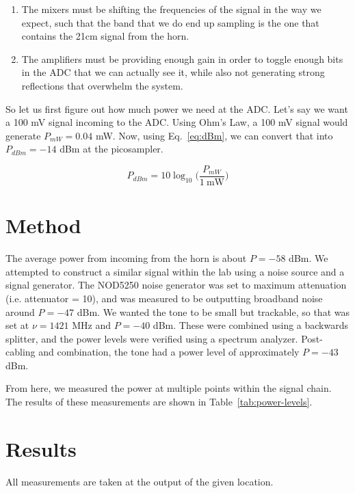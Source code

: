 \documentclass[11pt]{article}
\begin{document}
\begin{enumerate}
 \item The mixers must be shifting the frequencies of the signal in the way we 
  expect, such that the band that we do end up sampling is the one that 
  contains the 21cm signal from the horn.
 \item The amplifiers must be providing enough gain in order to toggle enough 
  bits in the ADC that we can actually see it, while also not generating strong 
  reflections that overwhelm the system.
\end{enumerate}

So let us first figure out how much power we need at the ADC. Let's say we want 
a 100 mV signal incoming to the ADC. Using Ohm's Law, a 100 mV signal would 
generate $P_{mW} = 0.04$ mW. Now, using Eq.~\eqref{eq:dBm}, we can convert that 
into $P_{dBm} = -14$ dBm at the picosampler.

\begin{equation}
    \label{eq:dBm}
    P_{dBm} = 10 \log_{10}\Big(\frac{P_{mW}}{1~\textrm{mW}}\Big)
\end{equation}

\section{Method}

The average power from incoming from the horn is about $P = -58$ dBm. We 
attempted to construct a similar signal within the lab using a noise source and 
a signal generator. The NOD5250 noise generator was set to maximum attenuation 
(i.e. attenuator = 10), and was measured to be outputting broadband noise 
around $P = -47$ dBm. We wanted the tone to be small but trackable, so that was 
set at $\nu = 1421$ MHz and $P = -40$ dBm. These were combined using a 
backwards splitter, and the power levels were verified using a spectrum 
analyzer. Post-cabling and combination, the tone had a power level of 
approximately $P = -43$ dBm.

From here, we measured the power at multiple points within the signal chain.  
The results of these measurements are shown in Table~\ref{tab:power-levels}.

\section{Results}

All measurements are taken at the output of the given location.
\end{document}
